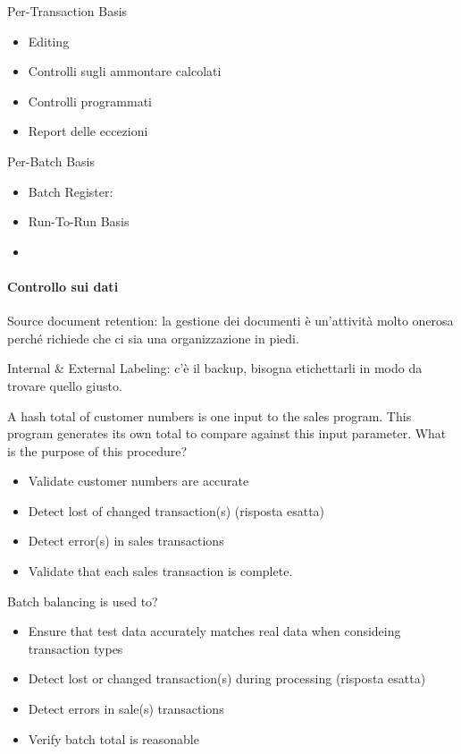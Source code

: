 Per-Transaction Basis 
\begin{itemize}
\item Editing
\item Controlli sugli ammontare calcolati
\item Controlli programmati
\item Report delle eccezioni
\end{itemize}

Per-Batch Basis

\begin{itemize}
\item Batch Register: 
\item Run-To-Run Basis
\item 
\end{itemize}

\paragraph{Controllo sui dati}


Source document retention: la gestione dei documenti è un'attività molto onerosa 
perché richiede che ci sia una organizzazione in piedi.

Internal \& External Labeling: c'è il backup, bisogna etichettarli in modo da 
trovare quello giusto.



A hash total of customer numbers is one input to the sales program. This program 
generates its own total to compare against this input parameter. What is the 
purpose of this procedure?

\begin{itemize}
\item Validate customer numbers are accurate
\item Detect lost of changed transaction(s) (risposta esatta)
\item Detect error(s) in sales transactions
\item Validate that each sales transaction is complete.
\end{itemize}




Batch balancing is used to?

\begin{itemize}
\item Ensure that test data accurately matches real data when consideing 
transaction types
\item Detect lost or changed transaction(s) during processing (risposta esatta)
\item Detect errors in sale(s) transactions
\item Verify batch total is reasonable
\end{itemize}



